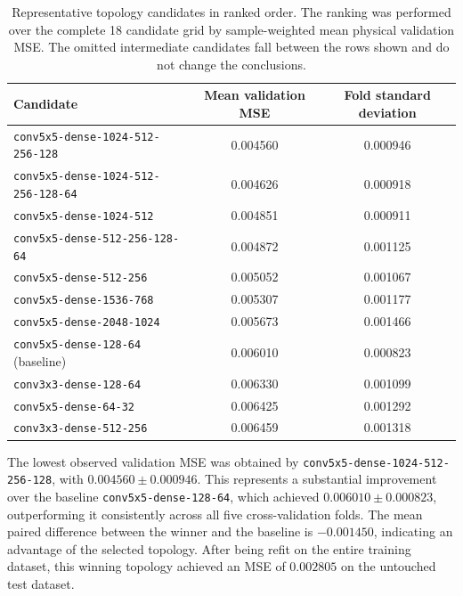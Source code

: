 \begin{table}[h!]
    \centering
    \begin{tabular}{lcc}
        \hline
        Candidate & Mean validation MSE & Fold standard deviation \\
        \hline
        \texttt{conv5x5-dense-1024-512-256-128} & 0.004560 & 0.000946 \\
        \texttt{conv5x5-dense-1024-512-256-128-64} & 0.004626 & 0.000918 \\
        \texttt{conv5x5-dense-1024-512} & 0.004851 & 0.000911 \\
        \texttt{conv5x5-dense-512-256-128-64} & 0.004872 & 0.001125 \\
        \texttt{conv5x5-dense-512-256} & 0.005052 & 0.001067 \\
        \texttt{conv5x5-dense-1536-768} & 0.005307 & 0.001177 \\
        \texttt{conv5x5-dense-2048-1024} & 0.005673 & 0.001466 \\
        \texttt{conv5x5-dense-128-64} (baseline) & 0.006010 & 0.000823 \\
        \texttt{conv3x3-dense-128-64} & 0.006330 & 0.001099 \\
        \texttt{conv5x5-dense-64-32} & 0.006425 & 0.001292 \\
        \texttt{conv3x3-dense-512-256} & 0.006459 & 0.001318 \\
        \hline
    \end{tabular}
    \caption{Representative topology candidates in ranked order. The ranking was performed over the complete 18 candidate grid by sample-weighted mean physical validation MSE. The omitted intermediate candidates fall between the rows shown and do not change the conclusions.}
    \label{tab:04_topology_results}
\end{table}

The lowest observed validation MSE was obtained by \texttt{conv5x5-dense-1024-512-256-128}, with $0.004560\pm0.000946$. This represents a substantial improvement over the baseline \texttt{conv5x5-dense-128-64}, which achieved $0.006010\pm0.000823$, outperforming it consistently across all five cross-validation folds. The mean paired difference between the winner and the baseline is $-0.001450$, indicating an advantage of the selected topology. After being refit on the entire training dataset, this winning topology achieved an MSE of $0.002805$ on the untouched test dataset.\\

